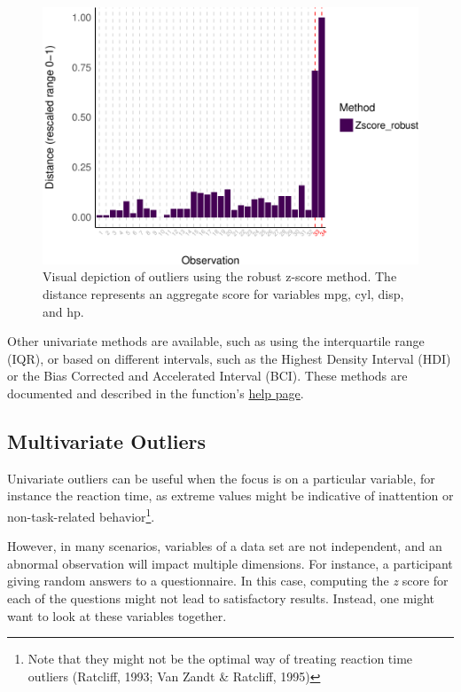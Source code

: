 \documentclass{article}
\begin{document}
\begin{figure}
\includegraphics[width=1\linewidth]{paper_files/figure-latex/univariate_implicit-1} \caption{Visual depiction of outliers using the robust z-score method. The distance represents an aggregate score for variables mpg, cyl, disp, and hp.}\label{fig:univariate_implicit}
\end{figure}

Other univariate methods are available, such as using the interquartile
range (IQR), or based on different intervals, such as the Highest
Density Interval (HDI) or the Bias Corrected and Accelerated Interval
(BCI). These methods are documented and described in the function's
\href{https://easystats.github.io/performance/reference/check_outliers.html}{help
page}.

\hypertarget{multivariate-outliers}{%
\subsection{Multivariate Outliers}\label{multivariate-outliers}}

Univariate outliers can be useful when the focus is on a particular
variable, for instance the reaction time, as extreme values might be
indicative of inattention or non-task-related behavior\footnote{ Note
  that they might not be the optimal way of treating reaction time
  outliers (Ratcliff, 1993; Van Zandt \& Ratcliff, 1995)}.

However, in many scenarios, variables of a data set are not independent,
and an abnormal observation will impact multiple dimensions. For
instance, a participant giving random answers to a questionnaire. In
this case, computing the \emph{z} score for each of the questions might
not lead to satisfactory results. Instead, one might want to look at
these variables together.
\end{document}
